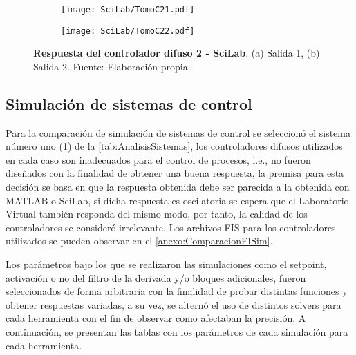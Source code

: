         \begin{figure}[htb]
            \centering
            \begin{subfigure}[t]{0.49\textwidth}
                \centering
                \texttt{[image: SciLab/TomoC21.pdf]}
                \caption{}
                \label{fig:respuestaC21SciLab}
            \end{subfigure}
            \hfill
            \begin{subfigure}[t]{0.49\textwidth}
                \centering
                \texttt{[image: SciLab/TomoC22.pdf]}
                \caption{}
                \label{fig:respuestaC22SciLab}
            \end{subfigure}
            
            \caption[Comparación - Respuesta del controlador difuso 2 - SciLab]{\textbf{Respuesta del controlador difuso 2 - SciLab}. (a) Salida 1, (b) Salida 2. Fuente: Elaboración propia. \label{fig:respuestaC2SciLab}}
        \end{figure}

        \clearpage

    \subsection{Simulación de sistemas de control}
        
        Para la comparación de simulación de sistemas de control se seleccionó el sistema número uno (1) de la \cref{tab:AnalisisSistemas}, los controladores difusos utilizados en cada caso son inadecuados para el control de procesos, i.e., no fueron diseñados con la finalidad de obtener una buena respuesta, la premisa para esta decisión se basa en que la respuesta obtenida debe ser parecida a la obtenida con MATLAB o SciLab, si dicha respuesta es oscilatoria se espera que el Laboratorio Virtual también responda del mismo modo, por tanto, la calidad de los controladores se consideró irrelevante. Los archivos FIS para los controladores utilizados se pueden observar en el \ref{anexo:ComparacionFISim}.

        Los parámetros bajo los que se realizaron las simulaciones como el setpoint, activación o no del filtro de la derivada y/o bloques adicionales, fueron seleccionados de forma arbitraria con la finalidad de probar distintas funciones y obtener respuestas variadas, a su vez, se alternó el uso de distintos solvers para cada herramienta con el fin de observar como afectaban la precisión. A continuación, se presentan las tablas con los parámetros de cada simulación para cada herramienta.


